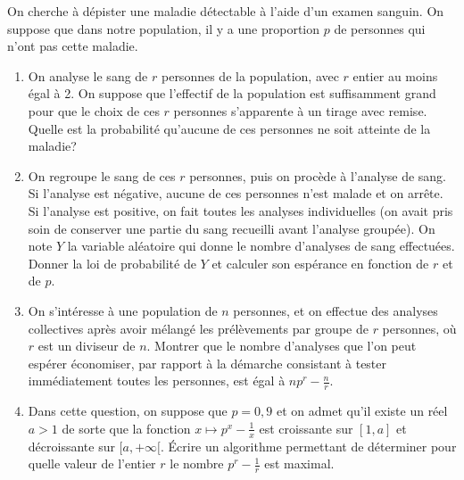 \documentclass[../PolyS4.tex]{subfiles}
\begin{document}
On cherche à dépister une maladie détectable à l'aide d'un examen sanguin. On suppose que dans notre population, il y a une proportion $p$ de personnes qui n'ont pas cette maladie.\\
\begin{enumerate}
\item On analyse le sang de $r$ personnes de la population, avec $r$ entier au moins égal à 2. On suppose que l'effectif de la population est suffisamment grand pour que le choix de ces $r$ personnes s'apparente à un tirage avec remise. Quelle est la probabilité qu'aucune de ces personnes ne soit atteinte de la maladie?
\item On regroupe le sang de ces $r$ personnes, puis on procède à l'analyse de sang. Si l'analyse est négative, aucune de ces personnes n'est malade et on arrête. Si l'analyse est positive, on fait toutes les analyses individuelles (on avait pris soin de conserver une partie du sang recueilli avant l'analyse groupée). On note $Y$ la variable aléatoire qui donne le nombre d'analyses de sang effectuées. Donner la loi de probabilité de $Y$ et calculer son espérance en fonction de $r$ et de $p$.
\item On s'intéresse à une population de $n$ personnes, et on effectue des analyses collectives après avoir mélangé les prélèvements par groupe de $r$ personnes, où $r$ est un diviseur de $n$. Montrer que le nombre d'analyses que l'on peut espérer économiser, par rapport à la démarche consistant à tester immédiatement toutes les personnes, est égal à $np^r-\frac nr$.
\item Dans cette question, on suppose que $p=0,9$ et on admet qu'il existe un réel $a>1$ de sorte que la fonction $x\mapsto p^x-\frac{1}x$ est croissante sur $[1,a]$ et décroissante sur $[a,+\infty[$. \'Ecrire un algorithme permettant de déterminer 
pour quelle valeur de l'entier $r$ le nombre $p^r-\frac 1r$ est maximal.\\
\end{enumerate} 


\end{document}
